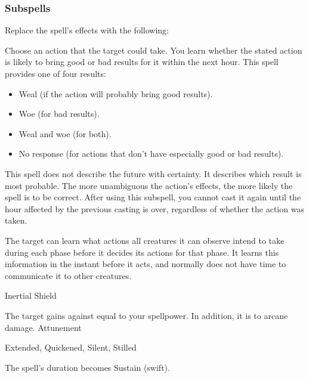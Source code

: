 \subsubsection{Subspells}
Replace the spell's effects with the following:
\begin{spellcontent}
\begin{augmenteffects}
\spelleffect
Choose an action that the target could take.
You learn whether the stated action is likely to bring good or bad results for it within the next hour.
This spell provides one of four results:
\begin{itemize}
\item Weal (if the action will probably bring good results).
\item Woe (for bad results).
\item Weal and woe (for both).
\item No response (for actions that don't have especially good or bad results).
\end{itemize}
This spell does not describe the future with certainty.
It describes which result is most probable.
The more unambiguous the action's effects, the more likely the spell is to be correct.
After using this subspell, you cannot cast it again until the hour affected by the previous casting is over, regardless of whether the action was taken.
\end{augmenteffects}
\end{spellcontent}
The target can learn what actions all creatures it can observe intend to take during each phase before it decides its actions for that phase.
It learns this information in the instant before it acts, and normally does not have time to communicate it to other creatures.
\begin{spellsection}{Inertial Shield}
\begin{spellheader}
\end{spellheader}
\begin{spellcontent}
\begin{spelltargetinginfo}
\end{spelltargetinginfo}
\begin{spelleffects}
\spelleffect
The target gains  against  equal to your spellpower.
In addition, it is  to arcane damage.
\spelldur Attunement
\end{spelleffects}
\end{spellcontent}
\begin{spellfooter}
 Extended, Quickened, Silent, Stilled
\end{spellfooter}
\begin{spellsubcontent}
\begin{spellcantrip}
The spell's duration becomes Sustain (swift).
\end{spellcantrip}
\end{spellsubcontent}
\end{spellsection}
